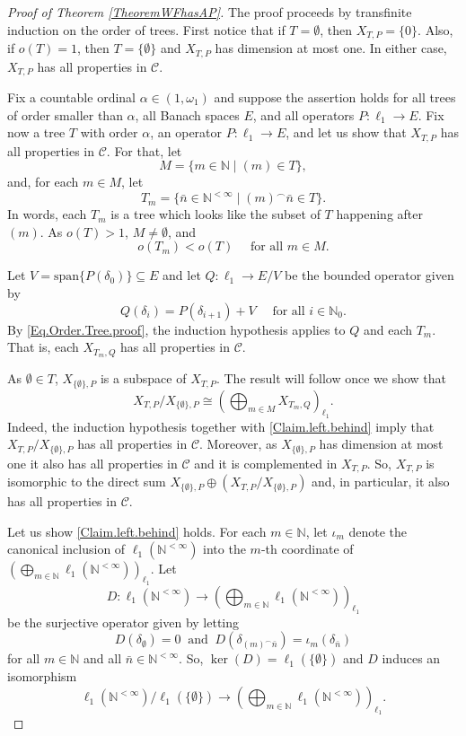 \documentclass[letterpaper]{amsart}
\numberwithin{equation}{section}
\theoremstyle{definition}
\newcommand{\N}{{\mathbb{N}}}
\begin{document}
\begin{proof}[Proof of Theorem \ref{TheoremWFhasAP}]
 The proof proceeds by transfinite induction on the order of trees. First notice that  if $T=\emptyset$, then $X_{T,P}=\{0\}$. Also, if  $o(T)=1$, then $T=\{\emptyset\}$ and    $X_{T,P}$ has dimension at most one. In either case, $X_{T,P}$ has all properties in $\mathcal C$.

Fix a countable ordinal $\alpha\in(1,\omega_1)$ and suppose the assertion holds for all trees of order smaller than $\alpha$, all Banach spaces $E$, and all operators $P\colon \ell_1\to E$. Fix now a tree $T$ with order $\alpha$, an operator  $P\colon \ell_1\to E$, and let us show that $X_{T,P}$ has all properties in  $\mathcal C$. For that, let
\[M=\{m\in\N\mid (m)\in T\},\]
and, for each $m\in M$, let
\[T_m=\{\bar n\in\N^{<\infty}\mid (m)^\smallfrown\bar n\in T\}.\]
In words, each $T_m$ is a tree which looks like the subset of $T$ happening after $(m)$. As $o(T)>1$, $M\neq\emptyset$, and
\begin{equation}\label{Eq.Order.Tree.proof}
 o(T_m)<o(T)\quad\text{ for all }m\in M.
\end{equation}

Let $V=\mathrm{span}\{P(\delta_0)\}\subseteq E$ and let $Q\colon\ell_1\to E/V$ be the bounded operator given by
\[Q(\delta_i)=P(\delta_{i+1})+V\quad\text{ for all }i\in\N_0.\]
By \eqref{Eq.Order.Tree.proof}, the induction hypothesis applies to $Q$ and each $T_m$. That is, each $X_{T_m,Q}$ has all properties in $\mathcal C$.

As $\emptyset\in T$, $X_{\{\emptyset\},P}$ is a subspace of $X_{T,P}$. The result will follow once we show that
\begin{equation}\label{Claim.left.behind}
X_{T,P}/X_{\{\emptyset\}, P} \cong
\left(\bigoplus_{m\in M}X_{T_m,Q}\right)_{\ell_1}.
\end{equation}
Indeed,  the induction hypothesis together with \eqref{Claim.left.behind} imply that $X_{T,P}/X_{\{\emptyset\}, P}$   has all properties in $\mathcal C$.  Moreover, as $X_{\{\emptyset\}, P}$ has dimension at most one it also has all properties in $\mathcal C$ and  it is complemented in $X_{T,P}$. So, $X_{T,P}$ is isomorphic to the direct sum $X_{\{\emptyset\}, P}\oplus(X_{T,P}/X_{\{\emptyset\}, P} )$ and, in particular, it also has all properties in $\mathcal C$.

Let us show \eqref{Claim.left.behind} holds. For each $m\in\N$, let $\iota_m$ denote the canonical inclusion of  $\ell_1(\N^{<\infty})$ into the $m$-th coordinate of  $(\bigoplus_{m\in\N}\ell_1(\N^{<\infty}))_{\ell_1}$. Let 
\[D\colon\ell_1(\N^{<\infty})\longrightarrow
\left(\bigoplus_{m\in\N}\ell_1(\N^{<\infty})\right)_{\ell_1}\]
be the surjective operator given by letting 
\[D(\delta_\emptyset)=0\ \text{ and }\ 
D(\delta_{(m)^\smallfrown\bar n})=\iota_m(\delta_{\bar n})\]
for all $m\in\N$ and all $\bar n\in \N^{<\infty}$. So, $\ker(D)=\ell_1(\{\emptyset\})$ and $D$ induces an   isomorphism
\begin{equation}
   \label{Eq.D.ind.iso}
   \ell_1(\N^{<\infty})/\ell_1(\{\emptyset\})\longrightarrow
\left(\bigoplus_{m\in\N}\ell_1(\N^{<\infty})\right)_{\ell_1}.
\end{equation}


\end{proof}
\end{document}
